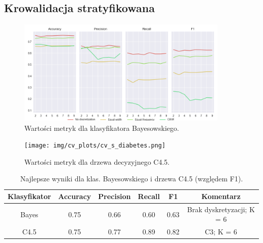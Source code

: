 \subsection*{Krowalidacja stratyfikowana}


\begin{figure}[H]
\center
    \includegraphics[width=0.9\textwidth]{img/cv_scores_stratifiedkfold/scoring_stratifiedkfold_diabetes.png}
    \caption{Wartości metryk dla klasyfikatora Bayesowskiego.}
\end{figure}

\begin{figure}[H]
    \center
    \texttt{[image: img/cv\_plots/cv\_s\_diabetes.png]}
    \caption{Wartości metryk dla drzewa decyzyjnego C4.5.}
\end{figure}

\begin{table}[H]
  \center
  \begin{tabular}{|c|c|c|c|c|c|}
    \hline
    Klasyfikator & Accuracy & Precision & Recall & F1 & Komentarz \\ \hline
    Bayes        & 0.75     & 0.66      & 0.60   & 0.63 & Brak dyskretyzacji; K = 6 \\ \hline
    C4.5         & 0.75     & 0.77      & 0.89   & 0.82 & C3; K = 6 \\ \hline
  \end{tabular}

  \caption{Najlepsze wyniki dla klas. Bayesowskiego i drzewa C4.5 (względem F1).}
\end{table}

